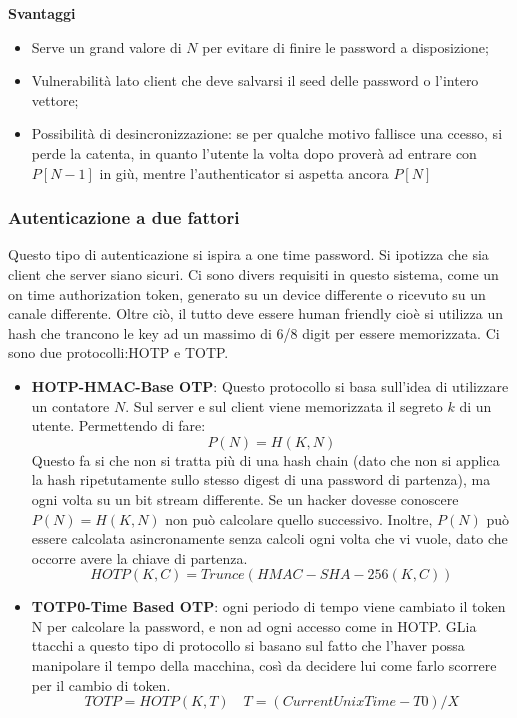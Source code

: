 \documentclass{article}
\theoremstyle{remark}
\begin{document}
\textbf{Svantaggi}
\begin{itemize}
	\item Serve un grand valore di $N$ per evitare di finire le password a disposizione;
	\item Vulnerabilità lato client che deve salvarsi il seed delle password o l'intero vettore;
	\item Possibilità di desincronizzazione: se per qualche motivo fallisce una ccesso, si perde la catenta, in quanto l'utente la volta dopo proverà ad entrare con $P[N-1]$ in giù, mentre l'authenticator si aspetta ancora $P[N]$
\end{itemize}
\subsubsection{Autenticazione a due fattori}
Questo tipo di autenticazione si ispira a one time password. Si ipotizza che sia client che server siano sicuri. Ci sono divers requisiti in questo sistema, come un on time authorization token, generato su un device differente o ricevuto su un canale differente. Oltre ciò, il tutto deve essere human friendly cioè si utilizza un hash che trancono le key ad un massimo di 6/8 digit per essere memorizzata.\newline
Ci sono due protocolli:HOTP e TOTP.\begin{itemize}
	\item \textbf{HOTP-HMAC-Base OTP}: Questo protocollo si basa sull'idea di utilizzare un contatore $N$. Sul server e sul client viene memorizzata il segreto $k$ di un utente. Permettendo di fare:\begin{equation*}
		      P(N)=H(K,N)
	      \end{equation*}
	      Questo fa si che non si tratta più di una hash chain (dato che non si applica la hash ripetutamente sullo stesso digest di una password di partenza), ma ogni volta su un bit stream differente. Se un hacker dovesse conoscere $P(N)=H(K,N)$ non può calcolare quello successivo. Inoltre, $P(N)$ può essere calcolata asincronamente senza calcoli ogni volta che vi vuole, dato che occorre avere la chiave di partenza.
	      \begin{equation*}
		      HOTP(K,C)=Trunce(HMAC-SHA-256(K,C))
	      \end{equation*}
	\item \textbf{TOTP0-Time Based OTP}: ogni periodo di tempo viene cambiato il token N per calcolare la password, e non ad ogni accesso come in HOTP. GLia ttacchi a questo tipo di protocollo si basano sul fatto che l'haver possa manipolare il tempo della macchina, così da decidere lui come farlo scorrere per il cambio di token.
	      \begin{equation*}
		      TOTP=HOTP(K,T)\quad T=(Current Unix Time-T0)/X
	      \end{equation*}
\end{itemize}
\end{document}
